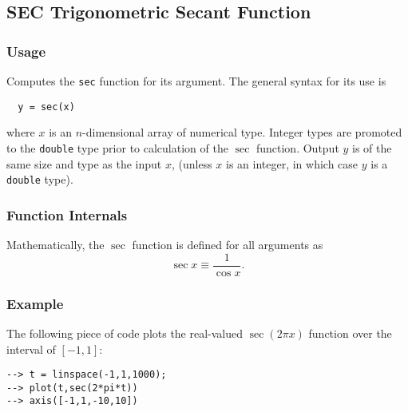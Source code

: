 %
%
%
\subsection{SEC Trigonometric Secant Function}
\subsubsection{Usage}
Computes the \verb|sec| function for its argument.  The general
syntax for its use is
\begin{verbatim}
  y = sec(x)
\end{verbatim}
where $x$ is an $n$-dimensional array of numerical type.
Integer types are promoted to the \verb|double| type prior to
calculation of the $\sec$ function.  Output $y$ is of the
same size and type as the input $x$, (unless $x$ is an
integer, in which case $y$ is a \verb|double| type).  
\subsubsection{Function Internals}
Mathematically, the $\sec$ function is defined for all arguments
as
\[
   \sec x \equiv \frac{1}{\cos x}.
\]
\subsubsection{Example}
The following piece of code plots the real-valued $\sec(2\pi x)$
function over the interval of $[-1,1]$:
\begin{verbatim}
--> t = linspace(-1,1,1000);
--> plot(t,sec(2*pi*t))
--> axis([-1,1,-10,10])
\end{verbatim}
